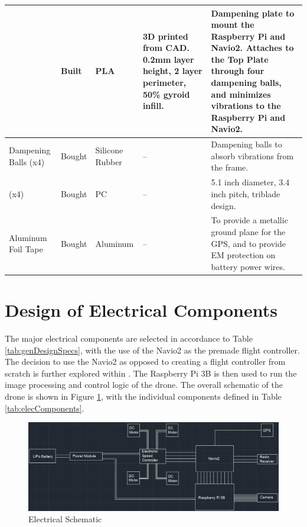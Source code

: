 \documentclass[12pt, titlepage]{article}
\begin{document}
\begin{landscape}
\begin{table}[!h]
\begin{center}
\begin{tabular}{ | m{2.7cm} | m{1.9cm} | m{1.4cm} | m{5.5cm} | m{10.3cm} | }
\hline
\nameref{Dampening Plate} & Built & PLA & 3D printed from CAD. 0.2mm layer height, 2 layer perimeter, 50\% gyroid infill. & 
    Dampening plate to mount the Raspberry Pi and Navio2. Attaches to the Top Plate through four dampening balls, and minimizes vibrations to the Raspberry Pi and Navio2. \\
\hline
Dampening Balls (x4) & Bought & Silicone Rubber & -- & 
    Dampening balls to absorb vibrations from the frame. \\
\hline
\nameref{Propeller} (x4) & Bought & PC & -- & 
    5.1 inch diameter, 3.4 inch pitch, triblade design. \\
\hline
Aluminum Foil Tape & Bought & Aluminum & -- & 
    To provide a metallic ground plane for the GPS, and to provide EM protection on battery power wires. \\
\hline
\end{tabular}
\end{center}
\end{table}
\end{landscape}

\clearpage

\section{Design of Electrical Components}
\label{sec:elecComponents}

The major electrical components are selected in accordance to Table \ref{tab:genDesignSpecs}, with the use of the Navio2 as the premade flight controller. The decision to use the Navio2 as opposed to creating a flight controller from scratch is further explored within . The Raspberry Pi 3B is then used to run the image processing and control logic of the drone. The overall schematic of the drone is shown in Figure \ref{elecSchematic}, with the individual components defined in Table \ref{tab:elecComponents}.

\begin{figure}[h!]
  \begin{center} 
  \caption{Electrical Schematic}
  \label{elecSchematic}
        \includegraphics[width=1\textwidth]{ElectricalSchematic.PNG}
  \end{center}
\end{figure}
\end{document}
